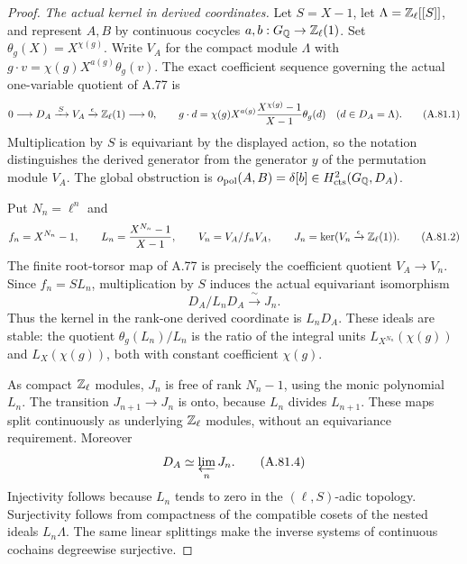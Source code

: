 \begin{proof}
\emph{The actual kernel in derived coordinates.}
Let $S=X-1$, let $\Lambda=\mathbb Z_\ell[[S]]$, and represent
$A,B$ by continuous cocycles
$a,b:G_\mathbb Q\to\mathbb Z_\ell(1)$.
Set $\theta_g(X)=X^{\chi(g)}$.
Write $V_A$ for the compact module $\Lambda$ with
$g\cdot v=\chi(g)X^{a(g)}\theta_g(v)$.
The exact coefficient sequence governing the actual
one-variable quotient of A.77 is
\[
 0\longrightarrow D_A\xrightarrow{\,S\,}V_A
       \xrightarrow{\epsilon}\mathbb Z_\ell(1)\longrightarrow0,
 \qquad
 g\cdot d=\chi(g)X^{a(g)}
       \frac{X^{\chi(g)}-1}{X-1}\theta_g(d)
       \quad(d\in D_A=\Lambda).
 \tag{A.81.1}
\]
Multiplication by $S$ is equivariant by the displayed
action, so the notation distinguishes the derived
generator from the generator $y$ of the permutation
module $V_A$.
The global obstruction is
$o_{\rm pol}(A,B)=\delta[b]\in H^2_{\rm cts}(G_\mathbb Q,D_A)$.

Put $N_n=\ell^n$ and
\[
 f_n=X^{N_n}-1,\qquad
 L_n=\frac{X^{N_n}-1}{X-1},\qquad
 V_n=V_A/f_nV_A,\qquad
 J_n=\ker(V_n\xrightarrow{\epsilon}\mathbb Z_\ell(1)).
 \tag{A.81.2}
\]
The finite root-torsor map of A.77 is precisely the
coefficient quotient $V_A\to V_n$.
Since $f_n=SL_n$, multiplication by $S$ induces the
actual equivariant isomorphism
\[
                         D_A/L_nD_A\xrightarrow{\ \sim\ }J_n.
 \tag{A.81.3}
\]
Thus the kernel in the rank-one derived coordinate is
$L_nD_A$.
These ideals are stable: the quotient
$\theta_g(L_n)/L_n$ is the ratio of the integral
units
$L_{X^{N_n}}(\chi(g))$ and $L_X(\chi(g))$,
both with constant coefficient $\chi(g)$.

As compact $\mathbb Z_\ell$ modules, $J_n$ is free of rank
$N_n-1$, using the monic polynomial $L_n$.
The transition $J_{n+1}\to J_n$ is onto, because
$L_n$ divides $L_{n+1}$.
These maps split continuously as underlying
$\mathbb Z_\ell$ modules, without an equivariance requirement.
Moreover
\[
                         D_A\simeq\varprojlim_nJ_n.
 \tag{A.81.4}
\]
Injectivity follows because $L_n$ tends to zero in
the $(\ell,S)$-adic topology.
Surjectivity follows from compactness of the compatible
cosets of the nested ideals $L_n\Lambda$.
The same linear splittings make the inverse systems
of continuous cochains degreewise surjective.


\end{proof}
